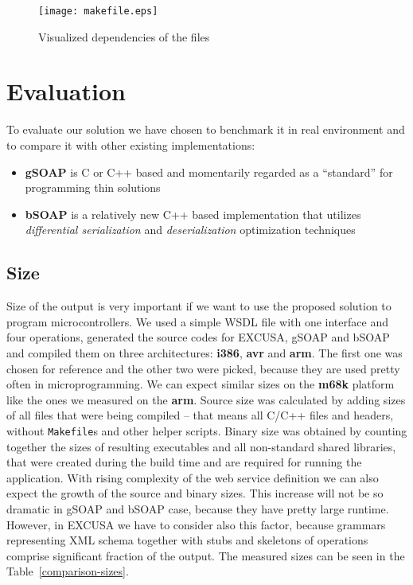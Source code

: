 \documentclass[12pt,notitlepage]{report}
\begin{document}
\begin{figure}[htb]
 \begin{center}
  \texttt{[image: makefile.eps]}
 \end{center}
 \caption{Visualized dependencies of the files}
 \label{makeile}
\end{figure}

\chapter{Evaluation}

To evaluate our solution we have chosen to benchmark it in real environment and to compare it with other existing implementations:
\begin{itemize}
 \item \textbf{gSOAP}\cite{gsoap} is C or C++ based and momentarily regarded as a ``standard'' for programming thin solutions
 \item \textbf{bSOAP}\cite{bsoap} is a relatively new C++ based implementation that utilizes \textit{differential serialization} and \textit{deserialization} optimization techniques
\end{itemize}

\section{Size}
\label{results-size}

Size of the output is very important if we want to use the proposed solution to program microcontrollers. We used a simple WSDL file with one interface and four operations, generated the source codes for EXCUSA, gSOAP and bSOAP and compiled them on three architectures: \textbf{i386}, \textbf{avr} and \textbf{arm}. The first one was chosen for reference and the other two were picked, because they are used pretty often in microprogramming. We can expect similar sizes on the \textbf{m68k} platform like the ones we measured on the \textbf{arm}.  Source size was calculated by adding sizes of all files that were being compiled -- that means all C/C++ files and headers, without \texttt{Makefile}s and other helper scripts. Binary size was obtained by counting together the sizes of resulting executables and all non-standard shared libraries, that were created during the build time and are required for running the application. With rising complexity of the web service definition we can also expect the growth of the source and binary sizes. This increase will not be so dramatic in gSOAP and bSOAP case, because they have pretty large runtime. However, in EXCUSA we have to consider also this factor, because grammars representing XML schema together with stubs and skeletons of operations comprise significant fraction of the output. The measured sizes can be seen in the Table~\ref{comparison-sizes}.
\end{document}
